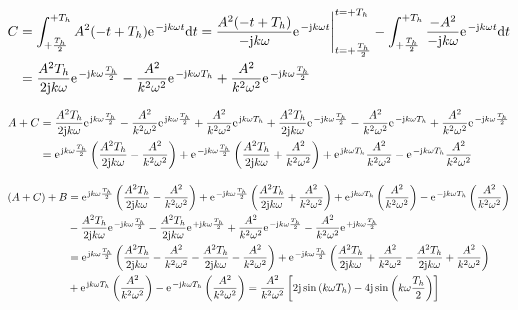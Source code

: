 \documentclass[11pt,a4paper,DIV=12]{scrartcl}
\begin{document}
%
\begin{align}
	C&=\int_{+\frac{T_h}{2}}^{+T_h}A^2(-t+T_h)\e^{-\im k \omega t}\diff t
	=\frac{A^2(-t+T_h)}{-\im k \omega }\e^{-\im k \omega t}\Bigg |_{t=+\frac{T_h}{2}}^{t=+T_h}-\int_{+\frac{T_h}{2}}^{+T_h}\frac{-A^2}{-\im k \omega }\e^{-\im k \omega t}\diff t\nonumber \\
	&=\frac{A^2T_h}{2\im k \omega}\e^{-\im k \omega \frac{T_h}{2}}-\frac{A^2}{k^2\omega^2}\e^{-\im k \omega T_h}+\frac{A^2}{k^2\omega^2}\e^{-\im k \omega \frac{T_h}{2}}
\end{align}
%

%
\begin{align}
	A+C&=\frac{A^2T_h}{2\im k \omega }\e^{\im k \omega \frac{T_h}{2}}-\frac{A^2}{k^2\omega^2}\e^{\im k \omega \frac{T_h}{2}}+\frac{A^2}{k^2\omega^2}\e^{\im k \omega T_h}+\frac{A^2T_h}{2\im k \omega}\e^{-\im k \omega \frac{T_h}{2}}-\frac{A^2}{k^2\omega^2}\e^{-\im k \omega T_h}+\frac{A^2}{k^2\omega^2}\e^{-\im k \omega \frac{T_h}{2}}\nonumber \\
	&=\e^{\im k \omega \frac{T_h}{2}}\left (\frac{A^2T_h}{2\im k \omega}-\frac{A^2}{k^2\omega^2}\right )+\e^{-\im k \omega \frac{T_h}{2}}\left (\frac{A^2T_h}{2\im k \omega}+\frac{A^2}{k^2\omega^2}\right )+\e^{\im k \omega T_h}\frac{A^2}{k^2\omega^2}-\e^{-\im k \omega T_h}\frac{A^2}{k^2\omega^2}
\end{align}
%

%
\begin{align}
	(A+C)+B&=\e^{\im k \omega \frac{T_h}{2}}\left (\frac{A^2T_h}{2\im k \omega}-\frac{A^2}{k^2\omega^2}\right )+\e^{-\im k \omega \frac{T_h}{2}}\left (\frac{A^2T_h}{2\im k \omega}+\frac{A^2}{k^2\omega^2}\right )+\e^{\im k \omega T_h}\left (\frac{A^2}{k^2\omega^2}\right )-\e^{-\im k \omega T_h}\left (\frac{A^2}{k^2\omega^2}\right ) \nonumber \\
	&-\frac{A^2T_h}{2\im k \omega}\e^{-\im k \omega \frac{T_h}{2}}-\frac{A^2T_h}{2\im k \omega}\e^{+\im k \omega \frac{T_h}{2}}+\frac{A^2}{k^2\omega^2}\e^{-\im k \omega \frac{T_h}{2}}-\frac{A^2}{ k^2 \omega^2}\e^{+\im k \omega \frac{T_h}{2}}\nonumber \\
	&=\e^{\im k \omega \frac{T_h}{2}}\left (\frac{A^2T_h}{2\im k \omega}-\frac{A^2}{k^2\omega^2}-\frac{A^2T_h}{2\im k \omega}-\frac{A^2}{k^2\omega^2}\right )+\e^{-\im k \omega \frac{T_h}{2}}\left (\frac{A^2T_h}{2\im k \omega}+\frac{A^2}{k^2\omega^2}-\frac{A^2T_h}{2 \im k \omega}+\frac{A^2}{k^2\omega^2}\right )\nonumber \\
	&+\e^{\im k \omega T_h}\left (\frac{A^2}{k^2\omega^2}\right )-\e^{-\im k \omega T_h}\left (\frac{A^2}{k^2\omega^2}\right )=\frac{A^2}{k^2\omega^2}\left [2\im\sin\left(k\omega T_h\right)-4\im\sin\left(k\omega \frac{T_h}{2}\right)\right ]
\end{align}
%
\end{document}

